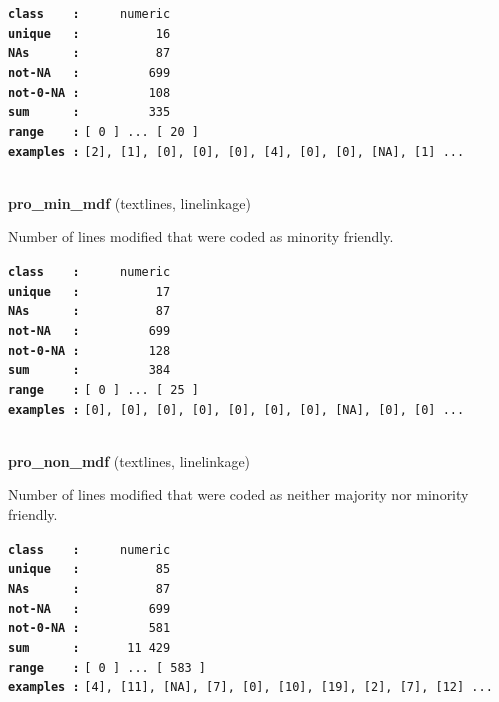 \documentclass[]{article}
\begin{document}
\textbf{\texttt{class\ \ \ \ :}} \texttt{~~~~~numeric}\\
\textbf{\texttt{unique\ \ \ :}} \texttt{~~~~~~~~~~16}\\
\textbf{\texttt{NAs\ \ \ \ \ \ :}} \texttt{~~~~~~~~~~87}\\
\textbf{\texttt{not-NA\ \ \ :}} \texttt{~~~~~~~~~699}\\
\textbf{\texttt{not-0-NA\ :}} \texttt{~~~~~~~~~108}\\
\textbf{\texttt{sum\ \ \ \ \ \ :}} \texttt{~~~~~~~~~335}\\
\textbf{\texttt{range\ \ \ \ :}}
\texttt{{[}\ 0\ {]}\ ...\ {[}\ 20\ {]}}\\
\textbf{\texttt{examples\ :}}
\texttt{{[}2{]},\ {[}1{]},\ {[}0{]},\ {[}0{]},\ {[}0{]},\ {[}4{]},\ {[}0{]},\ {[}0{]},\ {[}NA{]},\ {[}1{]}\ ...}\\

~

\textbf{pro\_min\_mdf} (textlines, linelinkage)

Number of lines modified that were coded as minority friendly.

\textbf{\texttt{class\ \ \ \ :}} \texttt{~~~~~numeric}\\
\textbf{\texttt{unique\ \ \ :}} \texttt{~~~~~~~~~~17}\\
\textbf{\texttt{NAs\ \ \ \ \ \ :}} \texttt{~~~~~~~~~~87}\\
\textbf{\texttt{not-NA\ \ \ :}} \texttt{~~~~~~~~~699}\\
\textbf{\texttt{not-0-NA\ :}} \texttt{~~~~~~~~~128}\\
\textbf{\texttt{sum\ \ \ \ \ \ :}} \texttt{~~~~~~~~~384}\\
\textbf{\texttt{range\ \ \ \ :}}
\texttt{{[}\ 0\ {]}\ ...\ {[}\ 25\ {]}}\\
\textbf{\texttt{examples\ :}}
\texttt{{[}0{]},\ {[}0{]},\ {[}0{]},\ {[}0{]},\ {[}0{]},\ {[}0{]},\ {[}0{]},\ {[}NA{]},\ {[}0{]},\ {[}0{]}\ ...}\\

~

\textbf{pro\_non\_mdf} (textlines, linelinkage)

Number of lines modified that were coded as neither majority nor
minority friendly.

\textbf{\texttt{class\ \ \ \ :}} \texttt{~~~~~numeric}\\
\textbf{\texttt{unique\ \ \ :}} \texttt{~~~~~~~~~~85}\\
\textbf{\texttt{NAs\ \ \ \ \ \ :}} \texttt{~~~~~~~~~~87}\\
\textbf{\texttt{not-NA\ \ \ :}} \texttt{~~~~~~~~~699}\\
\textbf{\texttt{not-0-NA\ :}} \texttt{~~~~~~~~~581}\\
\textbf{\texttt{sum\ \ \ \ \ \ :}} \texttt{~~~~~~11~429}\\
\textbf{\texttt{range\ \ \ \ :}}
\texttt{{[}\ 0\ {]}\ ...\ {[}\ 583\ {]}}\\
\textbf{\texttt{examples\ :}}
\texttt{{[}4{]},\ {[}11{]},\ {[}NA{]},\ {[}7{]},\ {[}0{]},\ {[}10{]},\ {[}19{]},\ {[}2{]},\ {[}7{]},\ {[}12{]}\ ...}\\
\end{document}
